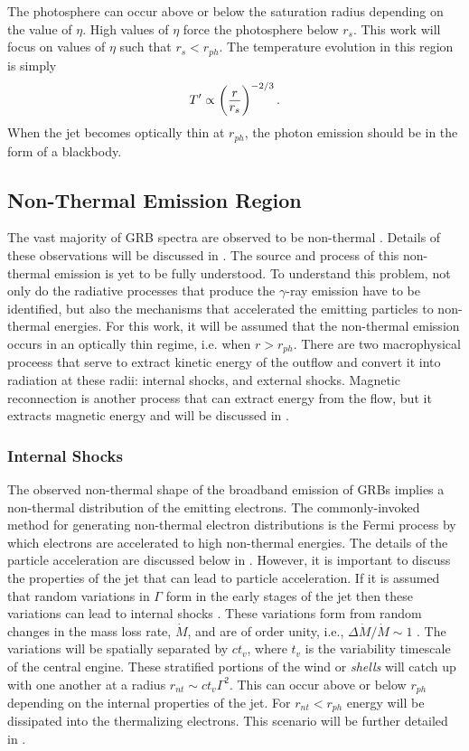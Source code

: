 The photosphere can occur above or below the saturation radius
depending on the value of $\eta$. High values of $\eta$ force the
photosphere below $r_s$. This work will focus on values of $\eta$ such
that $r_s<r_{ph}$. The temperature evolution in this region is simply
\cite{Meszaros:1993}
\begin{equation}
  \label{eq:ktevo}
  T^{\prime}\propto \left(\dover{r}{r_s}\right)^{-2/3}.
\end{equation}
When the jet becomes optically thin at $r_{ph}$, the photon emission
should be in the form of a blackbody.


\subsection{Non-Thermal Emission Region}
\label{sec:nter}
The vast majority of GRB spectra are observed to be non-thermal
\cite{Goldstein:2012}. Details of these observations will be discussed
in . The source and process of this
non-thermal emission is yet to be fully understood. To understand this
problem, not only do the radiative processes that produce the
$\gamma$-ray emission have to be identified, but also the mechanisms
that accelerated the emitting particles to non-thermal energies. For
this work, it will be assumed that the non-thermal emission occurs in
an optically thin regime, i.e. when $r>r_{ph}$. There are two
macrophysical proceess that serve to extract kinetic energy of the
outflow and convert it into radiation at these radii: internal shocks,
and external shocks. Magnetic reconnection is another process that can
extract energy from the flow, but it extracts magnetic energy and will
be discussed in .


\subsubsection{Internal  Shocks}
\label{sec:nter:is}
The observed non-thermal shape of the broadband emission of GRBs
implies a non-thermal distribution of the emitting electrons. The
commonly-invoked method for generating non-thermal electron
distributions is the Fermi process by which electrons are accelerated
to high non-thermal energies. The details of the particle acceleration
are discussed below in . However, it is important to
discuss the properties of the jet that can lead to particle
acceleration. If it is assumed that random variations in $\Gamma$ form
in the early stages of the jet then these variations can lead to
internal shocks \cite{Rees:1994,Daigne:1998}. These variations form
from random changes in the mass loss rate, $\dot{M}$, and are of order
unity, i.e., $\Delta \dot{M}/\dot{M}\sim 1$ . The variations will be spatially separated by $c t_v$, where
$t_v$ is the variability timescale of the central engine. These stratified portions of the
wind or \emph{shells} will catch up with one another at a radius
$r_{nt} \sim c t_v \Gamma^2$. This can occur above or below $r_{ph}$
depending on the internal properties of the jet. For $r_{nt}<r_{ph}$
energy will be dissipated into the thermalizing electrons. This
scenario will be further detailed in .

